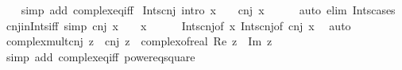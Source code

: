 \begin{isabellebody}
%
\isadelimproof
\ \ %
\endisadelimproof
%
\isatagproof
{}\isamarkupfalse%
\ {\isacharparenleft}{\kern0pt}simp\ add{\isacharcolon}{\kern0pt}\ complex{\isacharunderscore}{\kern0pt}eq{\isacharunderscore}{\kern0pt}iff{\isacharparenright}{\kern0pt}%
\endisatagproof
{\isafoldproof}%
%
\isadelimproof
\isanewline
%
\endisadelimproof
\isanewline
{}\isamarkupfalse%
\ Ints{\isacharunderscore}{\kern0pt}cnj\ {\isacharbrackleft}{\kern0pt}intro{\isacharbrackright}{\kern0pt}{\isacharcolon}{\kern0pt}\ {\isachardoublequoteopen}x\ {\isasymin}\ {\isasymint}\ {\isasymLongrightarrow}\ cnj\ x\ {\isasymin}\ {\isasymint}{\isachardoublequoteclose}\isanewline
%
\isadelimproof
\ \ %
\endisadelimproof
%
\isatagproof
{}\isamarkupfalse%
\ {\isacharparenleft}{\kern0pt}auto\ elim{\isacharbang}{\kern0pt}{\isacharcolon}{\kern0pt}\ Ints{\isacharunderscore}{\kern0pt}cases{\isacharparenright}{\kern0pt}%
\endisatagproof
{\isafoldproof}%
%
\isadelimproof
\isanewline
%
\endisadelimproof
\isanewline
{}\isamarkupfalse%
\ cnj{\isacharunderscore}{\kern0pt}in{\isacharunderscore}{\kern0pt}Ints{\isacharunderscore}{\kern0pt}iff\ {\isacharbrackleft}{\kern0pt}simp{\isacharbrackright}{\kern0pt}{\isacharcolon}{\kern0pt}\ {\isachardoublequoteopen}cnj\ x\ {\isasymin}\ {\isasymint}\ {\isasymlongleftrightarrow}\ x\ {\isasymin}\ {\isasymint}{\isachardoublequoteclose}\isanewline
%
\isadelimproof
\ \ %
\endisadelimproof
%
\isatagproof
{}\isamarkupfalse%
\ Ints{\isacharunderscore}{\kern0pt}cnj{\isacharbrackleft}{\kern0pt}of\ x{\isacharbrackright}{\kern0pt}\ Ints{\isacharunderscore}{\kern0pt}cnj{\isacharbrackleft}{\kern0pt}of\ {\isachardoublequoteopen}cnj\ x{\isachardoublequoteclose}{\isacharbrackright}{\kern0pt}\ \isamarkupfalse%
\ auto%
\endisatagproof
{\isafoldproof}%
%
\isadelimproof
\isanewline
%
\endisadelimproof
\isanewline
{}\isamarkupfalse%
\ complex{\isacharunderscore}{\kern0pt}mult{\isacharunderscore}{\kern0pt}cnj{\isacharcolon}{\kern0pt}\ {\isachardoublequoteopen}z\ {\isacharasterisk}{\kern0pt}\ cnj\ z\ {\isacharequal}{\kern0pt}\ complex{\isacharunderscore}{\kern0pt}of{\isacharunderscore}{\kern0pt}real\ {\isacharparenleft}{\kern0pt}{\isacharparenleft}{\kern0pt}Re\ z{\isacharparenright}{\kern0pt}\ {\isacharplus}{\kern0pt}\ {\isacharparenleft}{\kern0pt}Im\ z{\isacharparenright}{\kern0pt}\isanewline
%
\isadelimproof
\ \ %
\endisadelimproof
%
\isatagproof
{}\isamarkupfalse%
\ {\isacharparenleft}{\kern0pt}simp\ add{\isacharcolon}{\kern0pt}\ complex{\isacharunderscore}{\kern0pt}eq{\isacharunderscore}{\kern0pt}iff\ power{}{\isacharunderscore}{\kern0pt}eq{\isacharunderscore}{\kern0pt}square{\isacharparenright}{\kern0pt}%

\end{isabellebody}
